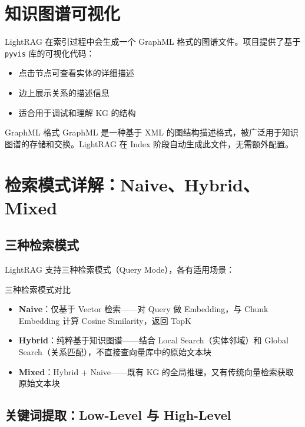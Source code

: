 \documentclass[a4paper]{article}
\begin{document}
\section{知识图谱可视化}

LightRAG 在索引过程中会生成一个 GraphML 格式的图谱文件。项目提供了基于 \texttt{pyvis} 库的可视化代码：

\begin{itemize}
    \item 点击节点可查看实体的详细描述
    \item 边上展示关系的描述信息
    \item 适合用于调试和理解 KG 的结构
\end{itemize}

\begin{knowledgebox}{GraphML 格式}
GraphML 是一种基于 XML 的图结构描述格式，被广泛用于知识图谱的存储和交换。LightRAG 在 Index 阶段自动生成此文件，无需额外配置。
\end{knowledgebox}


\section{检索模式详解：Naive、Hybrid、Mixed}

\subsection{三种检索模式}

LightRAG 支持三种检索模式（Query Mode），各有适用场景：

\begin{importantbox}{三种检索模式对比}
\begin{itemize}
    \item \textbf{Naive}：仅基于 Vector 检索——对 Query 做 Embedding，与 Chunk Embedding 计算 Cosine Similarity，返回 TopK
    \item \textbf{Hybrid}：纯粹基于知识图谱——结合 Local Search（实体邻域）和 Global Search（关系匹配），不直接查向量库中的原始文本块
    \item \textbf{Mixed}：Hybrid + Naive——既有 KG 的全局推理，又有传统向量检索获取原始文本块
\end{itemize}
\end{importantbox}

\subsection{关键词提取：Low-Level 与 High-Level}
\end{document}
